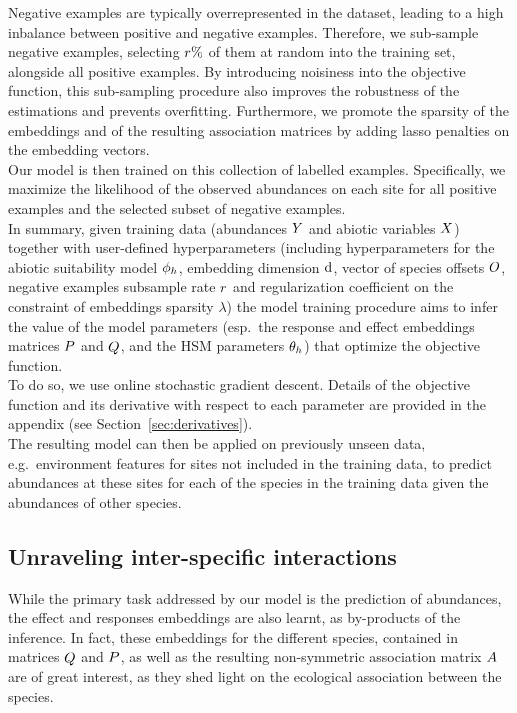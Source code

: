 \documentclass[10pt,a4paper]{article}
\begin{document}
Negative examples are typically overrepresented in the dataset, leading to a high inbalance between positive and negative examples. Therefore, we sub-sample negative examples, selecting $r \%$ of them at random into the training set, alongside all positive examples. By introducing noisiness into the objective function, this sub-sampling procedure also improves the robustness of the estimations and prevents overfitting. Furthermore, we promote the sparsity of the embeddings and of the resulting association matrices by adding lasso penalties on the embedding vectors. \\

Our model is then trained on this collection of labelled examples. Specifically, we maximize the likelihood of the observed abundances on each site for all positive examples and the selected subset of negative examples. \\

In summary, given training data (abundances $Y$ and abiotic variables $X$) together with user-defined hyperparameters (including hyperparameters for the abiotic suitability model $\phi_h$, embedding dimension $\operatorname{d}$, vector of species offsets $O$, negative examples subsample rate $r$ and regularization coefficient on the constraint of embeddings sparsity $\lambda$) the model training procedure aims to infer the value of the model parameters (esp.\ the response and effect embeddings matrices $P$ and $Q$, and the HSM parameters $\theta_h$) that optimize the objective function. \\

To do so, we use online stochastic gradient descent. Details of the objective function and its derivative with respect to each parameter are provided in the appendix (see Section~\ref{sec:derivatives}).\\

The resulting model can then be applied on previously unseen data, e.g.\ environment features for sites not included in the training data, to predict abundances at these sites for each of the species in the training data given the abundances of other species.

\subsection{Unraveling inter-specific interactions}
While the primary task addressed by our model is the prediction of abundances, the effect and responses embeddings are also learnt, as by-products of the inference. In fact, these embeddings for the different species, contained in matrices $Q$ and $P$, as well as the resulting non-symmetric association matrix $A$ are of great interest, as they shed light on the ecological association between the species. \\
\end{document}
